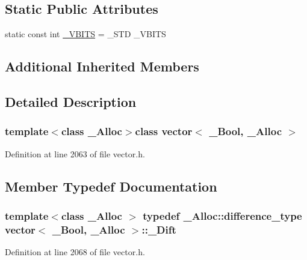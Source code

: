 \subsection*{Static Public Attributes}
\begin{DoxyCompactItemize}
\item 
static const int \hyperlink{classvector_3_01___bool_00_01___alloc_01_4_a225e72f3099206a41937bb30e5aaf9ed}{\+\_\+\+V\+B\+I\+T\+S} = \+\_\+\+S\+T\+D \+\_\+\+V\+B\+I\+T\+S
\end{DoxyCompactItemize}
\subsection*{Additional Inherited Members}


\subsection{Detailed Description}
\subsubsection*{template$<$class \+\_\+\+Alloc$>$class vector$<$ \+\_\+\+Bool, \+\_\+\+Alloc $>$}



Definition at line 2063 of file vector.\+h.



\subsection{Member Typedef Documentation}
\hypertarget{classvector_3_01___bool_00_01___alloc_01_4_ab724ede91c7a24f8e27c0dca79f10742}{
\subsubsection[{\+\_\+\+Dift}]{\setlength{\rightskip}{0pt plus 5cm}template$<$class \+\_\+\+Alloc $>$ typedef \+\_\+\+Alloc\+::difference\+\_\+type {\bf vector}$<$ \+\_\+\+Bool, \+\_\+\+Alloc $>$\+::{\bf \+\_\+\+Dift}}}\label{classvector_3_01___bool_00_01___alloc_01_4_ab724ede91c7a24f8e27c0dca79f10742}


Definition at line 2068 of file vector.\+h.

